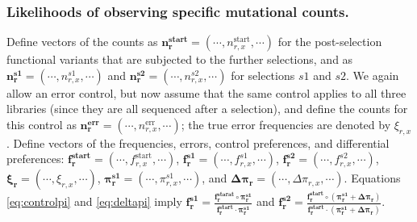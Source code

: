 \documentclass[twocolumn]{bmcart}%
\begin{document}
\subsubsection*{Likelihoods of observing specific mutational counts.}
Define vectors of the counts as $\mathbf{n_r^{\textbf{start}}}= \left(\cdots, n_{r,x}^{\textrm{start}}, \cdots\right)$ for the post-selection functional variants that are subjected to the further selections, and as $\mathbf{n_r^{s1}}= \left(\cdots, n_{r,x}^{s1}, \cdots\right)$ and $\mathbf{n_r^{s2}}= \left(\cdots, n_{r,x}^{s2}, \cdots\right)$ for selections $s1$ and $s2$. We again allow an error control, but now assume that the same control applies to all three libraries (since they are all sequenced after a selection), and define the counts for this control as $\mathbf{n_r^{\textbf{err}}}= \left(\cdots, n_{r,x}^{\textrm{err}}, \cdots\right)$; the true error frequencies are denoted by $\xi_{r,x}$. Define vectors of the frequencies, errors, control preferences, and differential preferences: $\boldsymbol{\mathbf{f_r^{\textbf{start}}}}= \left(\cdots, f_{r,x}^{\textrm{start}}, \cdots\right)$, $\boldsymbol{\mathbf{f_r^{s1}}}= \left(\cdots, f_{r,x}^{s1}, \cdots\right)$, $\boldsymbol{\mathbf{f_r^{s2}}}= \left(\cdots, f_{r,x}^{s2}, \cdots\right)$, $\boldsymbol{\mathbf{\xi_r}}= \left(\cdots, \xi_{r,x}, \cdots\right)$, $\boldsymbol{\mathbf{\pi^{s1}_r}}= \left(\cdots, \pi^{s1}_{r,x}, \cdots\right)$, and $\boldsymbol{\mathbf{\Delta\pi_r}}= \left(\cdots, \Delta\pi_{r,x}, \cdots\right)$. Equations \ref{eq:controlpi} and \ref{eq:deltapi} imply
$\boldsymbol{\mathbf{f_r^{s1}}}= \frac{\boldsymbol{\mathbf{f_r^{\textbf{starat}}}}\circ \boldsymbol{\mathbf{\pi_r^{s1}}}}{\boldsymbol{\mathbf{f_r^{\textbf{start}}}}\cdot \boldsymbol{\mathbf{\pi_r^{s1}}}}$ and $\boldsymbol{\mathbf{f_r^{s2}}} = \frac{\boldsymbol{\mathbf{f_r^{\textbf{start}}}}\circ \left(\boldsymbol{\mathbf{\pi_r^{s1}}} + \boldsymbol{\mathbf{\Delta\pi_r}}\right)}{\boldsymbol{\mathbf{f_r^{\textbf{start}}}}\cdot \left(\boldsymbol{\mathbf{\pi_r^{s1}}} + \boldsymbol{\mathbf{\Delta\pi_r}}\right)}$.
\end{document}
